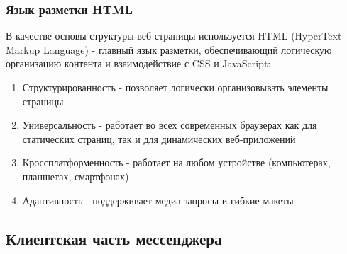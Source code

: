 \subsubsection{Язык разметки HTML}

В качестве основы структуры веб-страницы используется HTML (HyperText Markup Language) - главный язык разметки, обеспечивающий логическую организацию контента и взаимодействие с CSS и JavaScript:
\begin{enumerate}
	\item Структурированность - позволяет логически организовывать элементы страницы
	\item Универсальность - работает во всех современных браузерах как для статических страниц, так и для динамических веб-приложений
	\item Кроссплатформенность - работает на любом устройстве (компьютерах, планшетах, смартфонах)
	\item Адаптивность - поддерживает медиа-запросы и гибкие макеты
\end{enumerate}


\subsection{Клиентская часть мессенджера}


